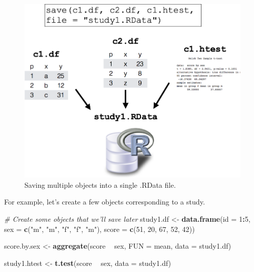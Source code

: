 \documentclass[]{book}
\newenvironment{Shaded}{\begin{snugshade}}{\end{snugshade}}
\newcommand{\KeywordTok}[1]{\textcolor[rgb]{0.13,0.29,0.53}{\textbf{#1}}}
\newcommand{\DataTypeTok}[1]{\textcolor[rgb]{0.13,0.29,0.53}{#1}}
\newcommand{\DecValTok}[1]{\textcolor[rgb]{0.00,0.00,0.81}{#1}}
\newcommand{\StringTok}[1]{\textcolor[rgb]{0.31,0.60,0.02}{#1}}
\newcommand{\CommentTok}[1]{\textcolor[rgb]{0.56,0.35,0.01}{\textit{#1}}}
\newcommand{\OperatorTok}[1]{\textcolor[rgb]{0.81,0.36,0.00}{\textbf{#1}}}
\newcommand{\NormalTok}[1]{#1}
\theoremstyle{definition}
\theoremstyle{definition}
\theoremstyle{remark}
\begin{document}
\begin{figure}

{\centering \includegraphics[width=0.75\linewidth]{images/rdata_example} 

}

\caption{Saving multiple objects into a single .RData file.}\label{fig:rdata}
\end{figure}

For example, let's create a few objects corresponding to a study.

\begin{Shaded}
\begin{Highlighting}[]
\CommentTok{# Create some objects that we'll save later}
\NormalTok{study1.df <-}\StringTok{ }\KeywordTok{data.frame}\NormalTok{(}\DataTypeTok{id =} \DecValTok{1}\OperatorTok{:}\DecValTok{5}\NormalTok{, }
                        \DataTypeTok{sex =} \KeywordTok{c}\NormalTok{(}\StringTok{"m"}\NormalTok{, }\StringTok{"m"}\NormalTok{, }\StringTok{"f"}\NormalTok{, }\StringTok{"f"}\NormalTok{, }\StringTok{"m"}\NormalTok{), }
                        \DataTypeTok{score =} \KeywordTok{c}\NormalTok{(}\DecValTok{51}\NormalTok{, }\DecValTok{20}\NormalTok{, }\DecValTok{67}\NormalTok{, }\DecValTok{52}\NormalTok{, }\DecValTok{42}\NormalTok{))}

\NormalTok{score.by.sex <-}\StringTok{ }\KeywordTok{aggregate}\NormalTok{(score }\OperatorTok{~}\StringTok{ }\NormalTok{sex, }
                          \DataTypeTok{FUN =}\NormalTok{ mean, }
                          \DataTypeTok{data =}\NormalTok{ study1.df)}

\NormalTok{study1.htest <-}\StringTok{ }\KeywordTok{t.test}\NormalTok{(score }\OperatorTok{~}\StringTok{ }\NormalTok{sex, }
                       \DataTypeTok{data =}\NormalTok{ study1.df)}
\end{Highlighting}
\end{Shaded}
\end{document}
